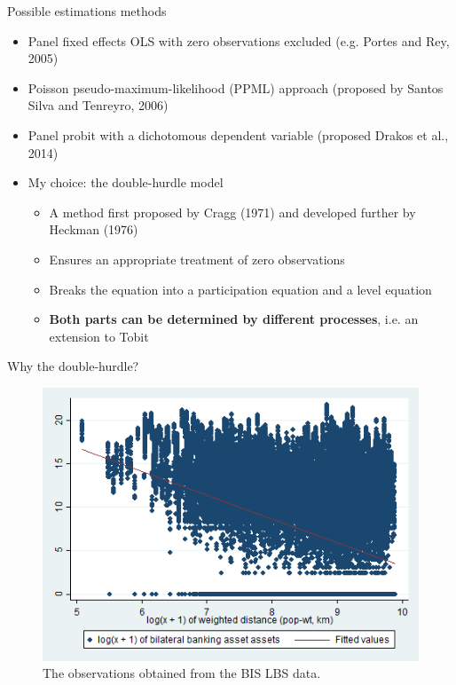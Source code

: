 \documentclass{beamer}
\begin{document}
\begin{frame}{Possible estimations methods}
\begin{itemize}
\item Panel fixed effects OLS with zero observations excluded (e.g. Portes and Rey, 2005)
\item Poisson pseudo-maximum-likelihood (PPML) approach (proposed by Santos Silva and Tenreyro, 2006)
\item Panel probit with a dichotomous dependent variable (proposed Drakos et al., 2014)
\item My choice: the double-hurdle model
\begin{itemize}
\item A method first proposed by Cragg (1971) and developed further by Heckman (1976)
\item Ensures an appropriate treatment of zero observations
\item Breaks the equation into a participation equation and a level equation
\item \textbf{Both parts can be determined by different processes}, i.e. an extension to Tobit
\end{itemize}
\end{itemize}
\end{frame}


\begin{frame}{Why the double-hurdle?} 
\begin{figure}
\includegraphics[width=\textwidth]{scatter_lfit_log1_ba_od_log1_distw.png}
\caption{\label{fig2}The observations obtained from the BIS LBS data.}
\end{figure}
\end{frame}
\end{document}
